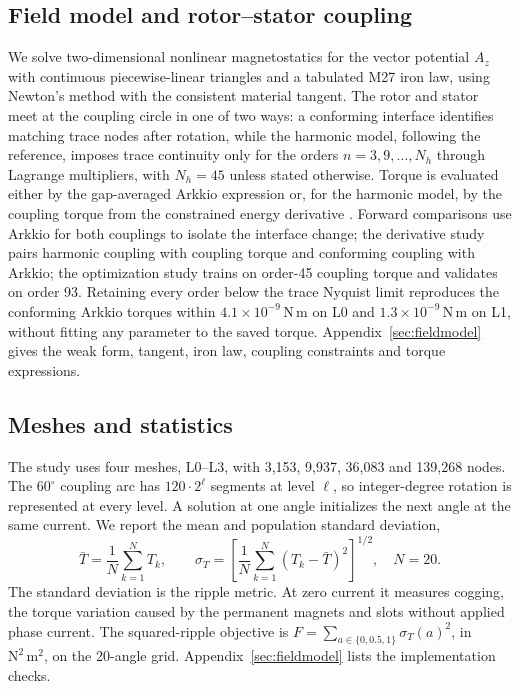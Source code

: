 \documentclass{anvil-paper}
\begin{document}
\subsection{Field model and rotor--stator coupling}
We solve two-dimensional nonlinear magnetostatics for the vector potential
$A_z$ with continuous piecewise-linear triangles and a tabulated M27 iron
law, using Newton's method with the consistent material tangent. The rotor
and stator meet at the coupling circle in one of two ways: a conforming
interface identifies matching trace nodes after rotation, while the
harmonic model, following the reference, imposes trace continuity only for
the orders $n=3,9,\ldots,N_h$ through Lagrange multipliers, with
$N_h=45$ unless stated otherwise. Torque is evaluated either by the
gap-averaged Arkkio expression \citep{arkkio1987} or, for the harmonic
model, by the coupling torque from the constrained energy derivative
\citep{egger2022torque}. Forward comparisons use Arkkio for both couplings
to isolate the interface change; the derivative study pairs harmonic
coupling with coupling torque and conforming coupling with Arkkio; the
optimization study trains on order-45 coupling torque and validates on
order 93. Retaining every order below the trace Nyquist limit reproduces
the conforming Arkkio torques within $4.1\times10^{-9}$\,N\,m on L0 and
$1.3\times10^{-9}$\,N\,m on L1, without fitting any parameter to the saved
torque. Appendix~\ref{sec:fieldmodel} gives the weak form, tangent, iron
law, coupling constraints and torque expressions.

\subsection{Meshes and statistics}
The study uses four meshes, L0--L3, with 3,153, 9,937, 36,083 and
139,268 nodes. The $60^\circ$ coupling arc has $120\cdot2^\ell$ segments at level
$\ell$, so integer-degree rotation is represented at every level.
A solution at one angle initializes the next angle at the same current.
We report the mean and population standard deviation,
\begin{equation}
 \bar T=\frac1N\sum_{k=1}^N T_k,\qquad
 \sigma_T=\left[\frac1N\sum_{k=1}^N(T_k-\bar T)^2\right]^{1/2},
 \quad N=20.
\end{equation}
The standard deviation is the ripple metric. At zero current it measures
cogging, the torque variation caused by the permanent magnets and slots
without applied phase current. The squared-ripple objective is
$F=\sum_{a\in\{0,0.5,1\}}\sigma_T(a)^2$, in $\mathrm{N^2\,m^2}$, on the
20-angle grid. Appendix~\ref{sec:fieldmodel} lists the implementation checks.
\end{document}
